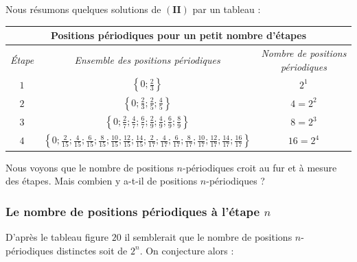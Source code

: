 \documentclass[a4paper,french,12pt]{article}
\begin{document}
Nous résumons quelques solutions de $\left(\textbf{II}\right)$ par un tableau :
\begin{center}
\begin{tabular}{|c||c|c|}
    \hline
    \multicolumn{3}{|c|}{\textbf{Positions périodiques pour un petit nombre d'étapes}} \\ \hline\hline
        \multirow{1}{*}{\emph{Étape}} & \emph{Ensemble des positions périodiques} & \emph{Nombre de positions périodiques} \\ \hline\hline
        \multirow{1}{*}{$1$} & $\left\{0;\frac{2}{3}\right\}$ & $2^1$ \\ \hline
        \multirow{1}{*}{$2$} & $\left\{0;\frac{2}{3};\frac{2}{5};\frac{4}{5}\right\}$ & $4=2^2$ \\ \hline
        \multirow{1}{*}{$3$} & $\left\{0;\frac{2}{7};\frac{4}{7};\frac{6}{7};\frac{2}{9};\frac{4}{9};\frac{6}{9};\frac{8}{9}\right\}$ & $8=2^3$ \\ \hline
        \multirow{1}{*}{$4$} & $\left\{0;\frac{2}{15};\frac{4}{15};\frac{6}{15};\frac{8}{15};\frac{10}{15};\frac{12}{15};\frac{14}{15};\frac{2}{17};\frac{4}{17};\frac{6}{17};\frac{8}{17};\frac{10}{17};\frac{12}{17};\frac{14}{17};\frac{16}{17}\right\}$ & $16=2^4$ \\
    \hline
\end{tabular}
\end{center}

Nous voyons que le nombre de positions $n$-périodiques croit au fur et à mesure des étapes. Mais combien y a-t-il de positions $n$-périodiques ?


\subsubsection{Le nombre de positions périodiques à l'étape $n$}
D'après le tableau figure $20$ il semblerait que le nombre de positions $n$-périodiques distinctes soit de $2^n$. On conjecture alors :


\end{document}
